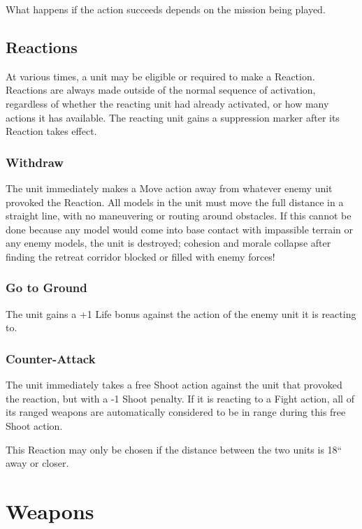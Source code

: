 \begin{multicols}{2}
What happens if the action succeeds depends on the mission being played.




\section*{Reactions}
At various times, a unit may be eligible or required to make a Reaction. Reactions are always made outside of the normal sequence of activation, regardless of whether the reacting unit had already activated, or how many actions it has available. The reacting unit gains a suppression marker after its Reaction takes effect.



\subsection*{Withdraw}
The unit immediately makes a Move action away from whatever enemy unit provoked the Reaction. All models in the unit must move the full distance in a straight line, with no maneuvering or routing around obstacles. If this cannot be done because any model would come into base contact with impassible terrain or any enemy models, the unit is destroyed; cohesion and morale collapse after finding the retreat corridor blocked or filled with enemy forces!



\subsection*{Go to Ground}
The unit gains a +1 Life bonus against the action of the enemy unit it is reacting to.



\subsection*{Counter-Attack}
The unit immediately takes a free Shoot action against the unit that provoked the reaction, but with a -1 Shoot penalty. If it is reacting to a Fight action, all of its ranged weapons are automatically considered to be in range during this free Shoot action.

This Reaction may only be chosen if the distance between the two units is 18`` away or closer.




\chapter*{Weapons}


\end{multicols}
